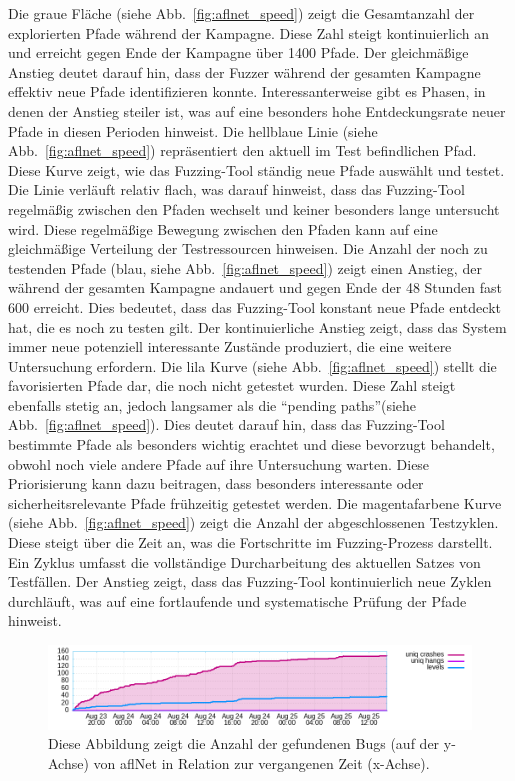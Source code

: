 Die graue Fläche (siehe Abb.~\ref{fig:aflnet_speed}) zeigt die Gesamtanzahl der explorierten Pfade während der Kampagne.
Diese Zahl steigt kontinuierlich an und erreicht gegen Ende der Kampagne über 1400 Pfade.
Der gleichmäßige Anstieg deutet darauf hin, dass der Fuzzer während der gesamten Kampagne effektiv neue Pfade
identifizieren konnte.
Interessanterweise gibt es Phasen, in denen der Anstieg steiler ist, was auf eine besonders hohe Entdeckungsrate neuer
Pfade in diesen Perioden hinweist.\newline
Die hellblaue Linie (siehe Abb.~\ref{fig:aflnet_speed}) repräsentiert den aktuell im Test befindlichen Pfad.
Diese Kurve zeigt, wie das Fuzzing-Tool ständig neue Pfade auswählt und testet.
Die Linie verläuft relativ flach, was darauf hinweist, dass das Fuzzing-Tool regelmäßig zwischen den Pfaden wechselt und
keiner besonders lange untersucht wird.
Diese regelmäßige Bewegung zwischen den Pfaden kann auf eine gleichmäßige Verteilung der Testressourcen hinweisen.\newline
Die Anzahl der noch zu testenden Pfade (blau, siehe Abb.~\ref{fig:aflnet_speed}) zeigt einen Anstieg, der während der gesamten Kampagne
andauert und gegen Ende der 48 Stunden fast 600 erreicht.
Dies bedeutet, dass das Fuzzing-Tool konstant neue Pfade entdeckt hat, die es noch zu testen gilt.
Der kontinuierliche Anstieg zeigt, dass das System immer neue potenziell interessante Zustände produziert, die eine
weitere Untersuchung erfordern.\newline
Die lila Kurve (siehe Abb.~\ref{fig:aflnet_speed}) stellt die favorisierten Pfade dar, die noch nicht getestet wurden.
Diese Zahl steigt ebenfalls stetig an, jedoch langsamer als die \enquote{pending paths}(siehe Abb.~\ref{fig:aflnet_speed}).
Dies deutet darauf hin, dass das Fuzzing-Tool bestimmte Pfade als besonders wichtig erachtet und diese bevorzugt behandelt,
obwohl noch viele andere Pfade auf ihre Untersuchung warten.
Diese Priorisierung kann dazu beitragen, dass besonders interessante oder sicherheitsrelevante Pfade frühzeitig getestet werden.
Die magentafarbene Kurve (siehe Abb.~\ref{fig:aflnet_speed}) zeigt die Anzahl der abgeschlossenen Testzyklen.
Diese steigt über die Zeit an, was die Fortschritte im Fuzzing-Prozess darstellt.
Ein Zyklus umfasst die vollständige Durcharbeitung des aktuellen Satzes von Testfällen.
Der Anstieg zeigt, dass das Fuzzing-Tool kontinuierlich neue Zyklen durchläuft, was auf eine fortlaufende und systematische
Prüfung der Pfade hinweist.
\begin{figure}[H]
    \centering
    \includegraphics[width=\textwidth]{img/low_freq}
    \caption[Grafik zur Veranschaulichung der Gefundenen Bugs mit AFLNet]{Diese Abbildung zeigt die Anzahl der gefundenen
    Bugs (auf der y-Achse) von \gls{afl}Net in Relation zur vergangenen Zeit (x-Achse).}
    \label{fig:aflnet_bugs}
\end{figure}
